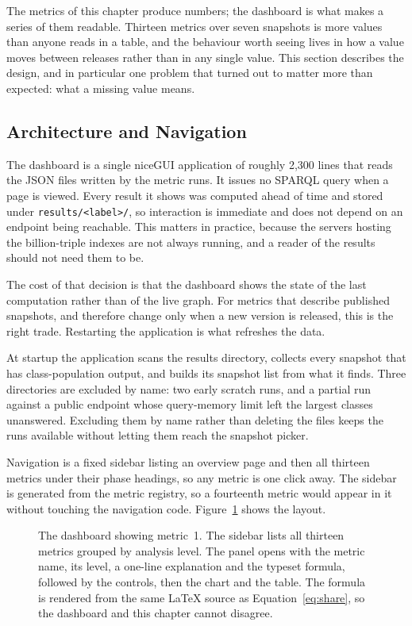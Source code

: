 The metrics of this chapter produce numbers; the dashboard is what makes a
series of them readable. Thirteen metrics over seven snapshots is more values
than anyone reads in a table, and the behaviour worth seeing lives in how a value
moves between releases rather than in any single value. This section describes
the design, and in particular one problem that turned out to matter more than
expected: what a missing value means.

\subsection{Architecture and Navigation}
\label{subsec:dash_architecture}

The dashboard is a single niceGUI application of roughly 2{,}300 lines that reads
the JSON files written by the metric runs. It issues no SPARQL query when a page
is viewed. Every result it shows was computed ahead of time and stored under
\texttt{results/<label>/}, so interaction is immediate and does not depend on an
endpoint being reachable. This matters in practice, because the servers hosting
the billion-triple indexes are not always running, and a reader of the results
should not need them to be.

The cost of that decision is that the dashboard shows the state of the last
computation rather than of the live graph. For metrics that describe published
snapshots, and therefore change only when a new version is released, this is the
right trade. Restarting the application is what refreshes the data.

At startup the application scans the results directory, collects every snapshot
that has class-population output, and builds its snapshot list from what it
finds. Three directories are excluded by name: two early scratch runs, and a
partial run against a public endpoint whose query-memory limit left the largest
classes unanswered. Excluding them by name rather than deleting the files keeps
the runs available without letting them reach the snapshot picker.

Navigation is a fixed sidebar listing an overview page and then all thirteen
metrics under their phase headings, so any metric is one click away. The sidebar is generated from the
metric registry, so a fourteenth metric would appear in it without touching the
navigation code. Figure~\ref{fig:dash_overview} shows the layout.

\begin{figure}[htbp]
  \centering
  \caption[]{The dashboard showing metric~1. The sidebar
    lists all thirteen metrics grouped by analysis level. The panel opens with
    the metric name, its level, a one-line explanation and the typeset formula,
    followed by the controls, then the chart and the table. The formula is
    rendered from the same \LaTeX{} source as
    Equation~\ref{eq:share}, so the dashboard and this chapter cannot disagree.}
  \label{fig:dash_overview}
\end{figure}

